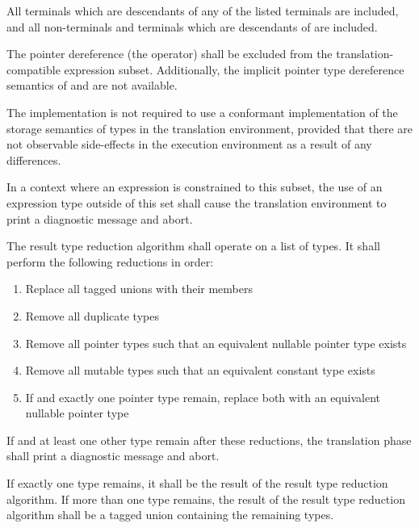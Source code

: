 \vspace{0.25cm}
\specsubitem
All terminals which are descendants of any of the listed terminals are
included, and all non-terminals and terminals which are descendants of
 are included.

\specsubitem
The pointer dereference  (the \terminal{*}
operator) shall be excluded from the translation-compatible expression subset.
Additionally, the implicit pointer type dereference semantics of
 and  are
not available.

\specsubitem
The implementation is not required to use a conformant implementation of the
storage semantics of types in the translation environment, provided that there
are not observable side-effects in the execution environment as a result of any
differences.

\specsubitem
In a context where an expression is constrained to this subset, the use of an
expression type outside of this set shall cause the translation environment to
print a diagnostic message and abort.


\specsubitem
The result type reduction algorithm shall operate on a list of types. It shall
perform the following reductions in order:

\begin{enumerate}
\item Replace all tagged unions with their members
\item Remove all duplicate types
\item Remove all pointer types such that an equivalent nullable pointer type
	exists
\item Remove all mutable types such that an equivalent constant type exists
\item If  and exactly one pointer type remain, replace both with
	an equivalent nullable pointer type
\end{enumerate}

\specsubitem
If  and at least one other type remain after these reductions,
the translation phase shall print a diagnostic message and abort.

\specsubitem
If exactly one type remains, it shall be the result of the result type reduction
algorithm. If more than one type remains, the result of the result type
reduction algorithm shall be a tagged union containing the remaining types.


